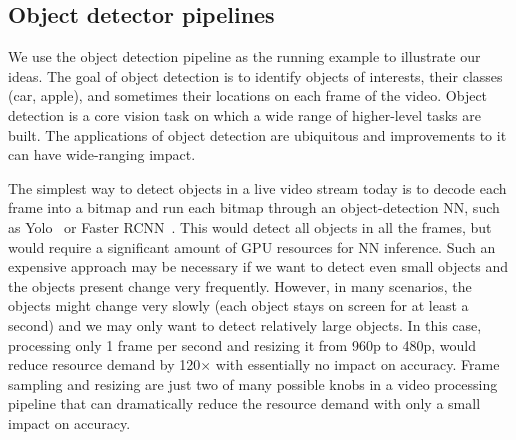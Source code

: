 \subsection{Object detector pipelines}
\label{sec:pipelines}

We use the object detection pipeline as the running example to illustrate our ideas. The goal of object detection is to identify objects of interests, their classes (\eg car, apple), and sometimes their locations on each frame of the video.
Object detection is a core vision task on which a wide range of higher-level tasks are built. 
The applications of object detection are ubiquitous and improvements to it can have wide-ranging impact. 



The simplest way to detect objects in a live video stream today is to decode each frame into a bitmap and run each bitmap through an object-detection NN, such as Yolo~\cite{yolo} or Faster RCNN~\cite{faster-rcnn}. 
This would detect all objects in all the frames, but would require a significant amount of GPU resources for NN inference.
Such an expensive approach may be necessary if we want to detect even small objects and the objects present change very frequently.
However, in many scenarios, the objects might change very slowly (\eg each object stays on screen for at least a second) and we may only want to detect relatively large objects. In this case, processing only 1 frame per second and resizing it from 960p to 480p, would reduce resource demand by 120$\times$ with essentially no impact on accuracy.
Frame sampling and resizing are just two of many possible knobs in a video processing pipeline that can dramatically reduce the resource demand with only a small impact on accuracy.

